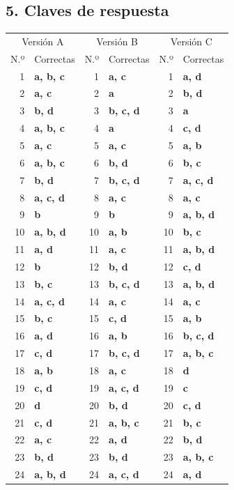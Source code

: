 \documentclass[10pt,letterpaper]{article}
\begin{document}
\subsection*{5. Claves de respuesta}
\begin{center}\footnotesize\begin{tabular}{@{}rl|rl|rl@{}}\toprule \multicolumn{2}{c|}{Versión A} & \multicolumn{2}{c|}{Versión B} & \multicolumn{2}{c}{Versión C}\\ N.º & Correctas & N.º & Correctas & N.º & Correctas\\\midrule
1 & \textbf{a, b, c} & 1 & \textbf{a, c} & 1 & \textbf{a, d}\\
2 & \textbf{a, c} & 2 & \textbf{a} & 2 & \textbf{b, d}\\
3 & \textbf{b, d} & 3 & \textbf{b, c, d} & 3 & \textbf{a}\\
4 & \textbf{a, b, c} & 4 & \textbf{a} & 4 & \textbf{c, d}\\
5 & \textbf{a, c} & 5 & \textbf{a, c} & 5 & \textbf{a, b}\\
6 & \textbf{a, b, c} & 6 & \textbf{b, d} & 6 & \textbf{b, c}\\
7 & \textbf{b, d} & 7 & \textbf{b, c, d} & 7 & \textbf{a, c, d}\\
8 & \textbf{a, c, d} & 8 & \textbf{a, c} & 8 & \textbf{a, c}\\
9 & \textbf{b} & 9 & \textbf{b} & 9 & \textbf{a, b, d}\\
10 & \textbf{a, b, d} & 10 & \textbf{a, b} & 10 & \textbf{b, c}\\
11 & \textbf{a, d} & 11 & \textbf{a, c} & 11 & \textbf{a, b, d}\\
12 & \textbf{b} & 12 & \textbf{b, d} & 12 & \textbf{c, d}\\
13 & \textbf{b, c} & 13 & \textbf{b, c, d} & 13 & \textbf{a, b, d}\\
14 & \textbf{a, c, d} & 14 & \textbf{a, c} & 14 & \textbf{a, c}\\
15 & \textbf{b, c} & 15 & \textbf{c, d} & 15 & \textbf{a, b}\\
16 & \textbf{a, d} & 16 & \textbf{a, b} & 16 & \textbf{b, c, d}\\
17 & \textbf{c, d} & 17 & \textbf{b, c, d} & 17 & \textbf{a, b, c}\\
18 & \textbf{a, b} & 18 & \textbf{a, c} & 18 & \textbf{d}\\
19 & \textbf{c, d} & 19 & \textbf{a, c, d} & 19 & \textbf{c}\\
20 & \textbf{d} & 20 & \textbf{b, d} & 20 & \textbf{c, d}\\
21 & \textbf{c, d} & 21 & \textbf{a, b, c} & 21 & \textbf{b, c}\\
22 & \textbf{a, c} & 22 & \textbf{a, d} & 22 & \textbf{b, d}\\
23 & \textbf{b, d} & 23 & \textbf{b, d} & 23 & \textbf{a, b, c}\\
24 & \textbf{a, b, d} & 24 & \textbf{a, c, d} & 24 & \textbf{a, d}\\
\bottomrule\end{tabular}\end{center}
\end{document}
